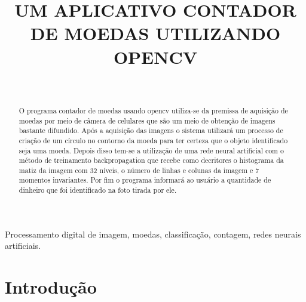 \documentclass[10pt,journal,compsoc]{IEEEtran}
\begin{document}
\title{UM APLICATIVO CONTADOR DE MOEDAS UTILIZANDO OPENCV}

\author{
	\and \\
}

\maketitle

\begin{abstract}
O programa contador de moedas usando opencv utiliza-se da premissa de aquisição de moedas por meio de câmera de celulares que são um meio de obtenção de imagens bastante difundido. Após a aquisição das imagens o sistema utilizará um processo de criação de um círculo no contorno da moeda para ter certeza que o objeto identificado seja uma moeda. Depois disso tem-se a utilização de uma rede neural artificial com o método de treinamento backpropagation que recebe como decritores o histograma da matiz da imagem com 32 níveis, o número de linhas e colunas da imagem e 7 momentos invariantes. Por fim o programa informará ao usuário a quantidade de dinheiro que foi identificado na foto tirada por ele.
\end{abstract}

\begin{IEEEkeywords}
Processamento digital de imagem, moedas, classificação, contagem, redes neurais artificiais.
\end{IEEEkeywords}


%
\section{Introdução}
\label{sec:introducao}
\end{document}

